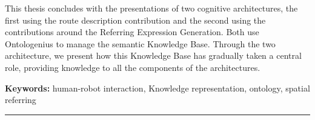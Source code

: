\documentclass[english,a4paper,11pt,twoside]{StyleThese}
\begin{document}
\begin{vcenterpage}
This thesis concludes with the presentations of two cognitive architectures, the first using the route description contribution and the second using the contributions around the Referring Expression Generation. Both use Ontologenius to manage the semantic Knowledge Base. Through the two architecture, we present how this Knowledge Base has gradually taken a central role, providing knowledge to all the components of the architectures.


\textbf{Keywords:} human-robot interaction, Knowledge representation, ontology, spatial referring
\\
\noindent\rule[2pt]{\textwidth}{0.5pt}
\end{vcenterpage}
\end{document}

